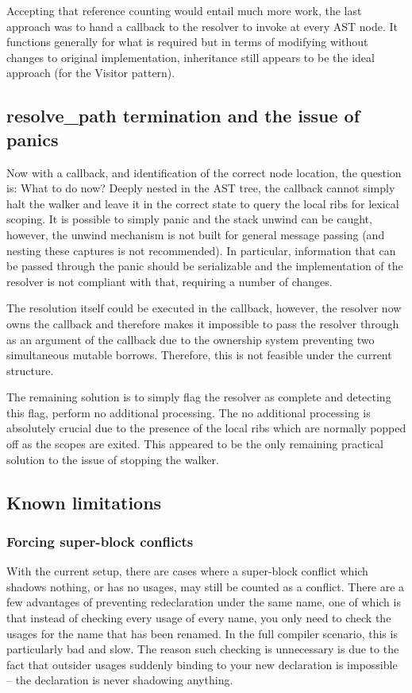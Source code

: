 Accepting that reference counting would entail much more work, the last approach was to hand a callback to the resolver to invoke at every AST node. It functions generally for what is required but in terms of modifying without changes to original implementation, inheritance still appears to be the ideal approach (for the Visitor pattern).

\subsection{resolve\_path termination and the issue of panics}
Now with a callback, and identification of the correct node location, the question is: What to do now? Deeply nested in the AST tree, the callback cannot simply halt the walker and leave it in the correct state to query the local ribs for lexical scoping. It is possible to simply panic and the stack unwind can be caught, however, the unwind mechanism is not built for general message passing (and nesting these captures is not recommended). In particular, information that can be passed through the panic should be serializable and the implementation of the resolver is not compliant with that, requiring a number of changes.

The resolution itself could be executed in the callback, however, the resolver now owns the callback and therefore makes it impossible to pass the resolver through as an argument of the callback due to the ownership system preventing two simultaneous mutable borrows. Therefore, this is not feasible under the current structure.

The remaining solution is to simply flag the resolver as complete and detecting this flag, perform no additional processing. The no additional processing is absolutely crucial due to the presence of the local ribs which are normally popped off as the scopes are exited. This appeared to be the only remaining practical solution to the issue of stopping the walker.

\subsection{Known limitations}\label{S:limit}
\subsubsection{Forcing super-block conflicts}
With the current setup, there are cases where a super-block conflict which shadows nothing, or has no usages, may still be counted as a conflict. There are a few advantages of preventing redeclaration under the same name, one of which is that instead of checking every usage of every name, you only need to check the usages for the name that has been renamed. In the full compiler scenario, this is particularly bad and slow. The reason such checking is unnecessary is due to the fact that outsider usages suddenly binding to your new declaration is impossible -- the declaration is never shadowing anything.

